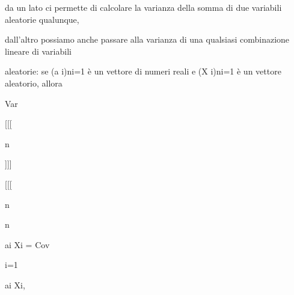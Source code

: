 \documentclass[a4paper,portrait,12pt]{article}
\begin{document}
\begin{flushleft}
da un lato ci permette di calcolare la varianza della somma di due variabili aleatorie qualunque,
\end{flushleft}


\begin{flushleft}
dall'altro possiamo anche passare alla varianza di una qualsiasi combinazione lineare di variabili
\end{flushleft}


\begin{flushleft}
aleatorie: se (a i)ni=1 \`{e} un vettore di numeri reali e (X i)ni=1 \`{e} un vettore aleatorio, allora
\end{flushleft}


\begin{flushleft}
Var
\end{flushleft}





[[[





\begin{flushleft}
n
\end{flushleft}





]]]





[[[





\begin{flushleft}
n
\end{flushleft}





\begin{flushleft}
n
\end{flushleft}





\begin{flushleft}
ai Xi = Cov
\end{flushleft}


\begin{flushleft}
i=1
\end{flushleft}





\begin{flushleft}
ai Xi,
\end{flushleft}
\end{document}
